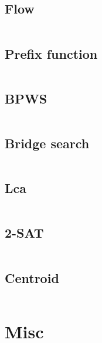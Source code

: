 \documentclass[11.5pt,a4paper,landscape,oneside]{amsart}
\newcommand{\regcode}[1]{\inputminted[xleftmargin=2em,linenos]{cpp}{code/#1}}
\begin{document}
\begin{multicols*}{2}
	\subsection{Flow}
		\regcode{flow.cpp}
	\subsection{Prefix function}
		\regcode{prefix_func.cpp}
	\subsection{BPWS}
		\regcode{bpws.cpp}
	\subsection{Bridge search}
		\regcode{br.cpp}
	\subsection{Lca}
		\regcode{lca.cpp}
	\subsection{2-SAT}
		\regcode{2sat.cpp}
	\subsection{Centroid}
		\regcode{centroid.cpp}

\clearpage

\section{Misc}

\end{multicols*}
\end{document}
